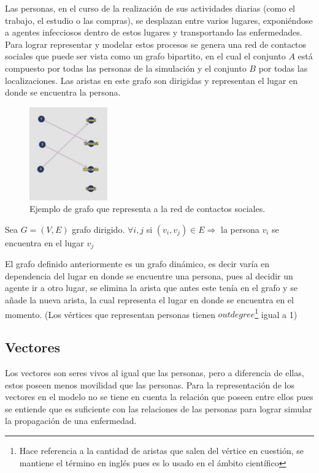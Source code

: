 Las personas, en el curso de la realización de sus actividades diarias (como el trabajo, el estudio o las compras),
se desplazan entre varios lugares, exponiéndose a agentes infecciosos dentro de estos lugares y transportando las
enfermedades. Para lograr representar y modelar estos procesos se genera una red de contactos sociales que puede
ser vista como un grafo bipartito, en el cual el conjunto $A$ está compuesto por todas las personas de la simulación
y el conjunto $B$ por todas las localizaciones. Las aristas en este grafo son dirigidas y representan 
el lugar en donde se encuentra la persona.


\begin{figure}[htb]
    \centering
    \includegraphics[width=0.3\textwidth]{Graphics/Grafo_Loc_Pers.jpeg}
    \caption{Ejemplo de grafo que representa a la red de contactos sociales.}
\end{figure}

\begin{center}
    Sea $G = (V,E)$ grafo dirigido. 
    $\forall i,j$ si $(v_i,v_j) \in E \Rightarrow$ la persona $v_i$ se encuentra en el lugar $v_j$ 
\end{center}

El grafo definido anteriormente es un grafo dinámico, es decir varía en dependencia del lugar en donde se encuentre
una persona, pues al decidir un agente ir a otro lugar, se elimina la arista que antes este tenía en el grafo y se 
añade la nueva arista, la cual representa el lugar en donde se encuentra en el momento. (Los vértices que representan
personas tienen $outdegree$\footnote{Hace referencia a la cantidad de aristas que salen del vértice en cuestión, 
se mantiene el término en inglés pues es lo usado en el ámbito científico} igual a 1)

\subsection{Vectores}
Los vectores son seres vivos al igual que las personas, pero a diferencia de ellas, estos poseen menos movilidad que las
personas. Para la representación de los vectores en el modelo no se tiene en cuenta la relación que 
poseen entre ellos pues se entiende que es suficiente con las relaciones de las personas para lograr simular 
la propagación de una enfermedad.

